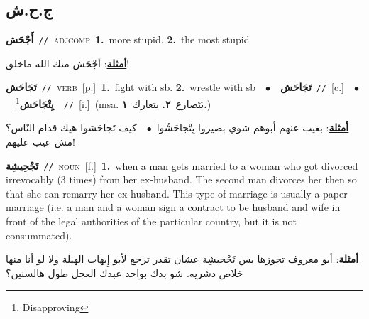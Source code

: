 \documentclass[10pt,a4paper,twoside]{article} %
\begin{document}
\begin{multicols}{2}
\vspace{-3mm}
\subsection*{\color{blue}\foreignlanguage{arabic}{ج.ح.ش}\color{blue}{}} 

{\setlength\topsep{0pt}\textbf{\foreignlanguage{arabic}{أَجْحَش}}\ {\color{gray}\texttt{//}\color{black}}\ \textsc{adj\textunderscore comp}\ \textbf{1.}~more stupid.  \textbf{2.}~the most stupid\  \begin{flushright}\color{gray}\foreignlanguage{arabic}{\textbf{\underline{\foreignlanguage{arabic}{أمثلة}}}: أجْحَش منك الله ماخلق!}\end{flushright}\color{black}} \vspace{2mm}

{\setlength\topsep{0pt}\textbf{\foreignlanguage{arabic}{تَجَاحَش}}\ {\color{gray}\texttt{//}\color{black}}\ \textsc{verb}\ [p.]\ \textbf{1.}~fight with sb.  \textbf{2.}~wrestle with sb\ \ $\bullet$\ \ \setlength\topsep{0pt}\textbf{\foreignlanguage{arabic}{تَجَاحَش}}\ {\color{gray}\texttt{//}\color{black}}\ [c.]\ \ $\bullet$\ \ \setlength\topsep{0pt}\textbf{\foreignlanguage{arabic}{يِتْجَاحَش}}\footnote{Disapproving}\ \ {\color{gray}\texttt{//}\color{black}}\ [i.]\ \color{gray}(msa. \foreignlanguage{arabic}{يَتَصارع}~\foreignlanguage{arabic}{\textbf{٢.}}  \foreignlanguage{arabic}{يتعارك}~\foreignlanguage{arabic}{\textbf{١.}})\color{black}\  \begin{flushright}\color{gray}\foreignlanguage{arabic}{\textbf{\underline{\foreignlanguage{arabic}{أمثلة}}}: بغيب عنهم أبوهم شوي بصيروا يِتْجاحَشُوا\ $\bullet$\ \  كيف تَجاحَشوا هيك قدام النّاس؟ مش عيب عليهم!}\end{flushright}\color{black}} \vspace{2mm}

{\setlength\topsep{0pt}\textbf{\foreignlanguage{arabic}{تَجْحِيشِة}}\ {\color{gray}\texttt{//}\color{black}}\ \textsc{noun}\ [f.]\ \textbf{1.}~when a man gets married to a woman who got divorced irrevocably (3 times) from her ex-husband. The second man divorces her then so that she can remarry her ex-husband. This type of marriage is usually a paper marriage (i.e. a man and a woman sign a contract to be husband and wife in front of the legal authorities of the particular country, but it is not consummated).\  \begin{flushright}\color{gray}\foreignlanguage{arabic}{\textbf{\underline{\foreignlanguage{arabic}{أمثلة}}}: أبو معروف تجوزها بس تَجْحيشِة عشان تقدر ترجع لأبو إِيهاب الهبلة ولا لو أنا منها خلاص دشريه. شو بدك بواحد عبدك العجل طول هالسنين؟}\end{flushright}\color{black}} \vspace{2mm}


\end{multicols}
\end{document}
